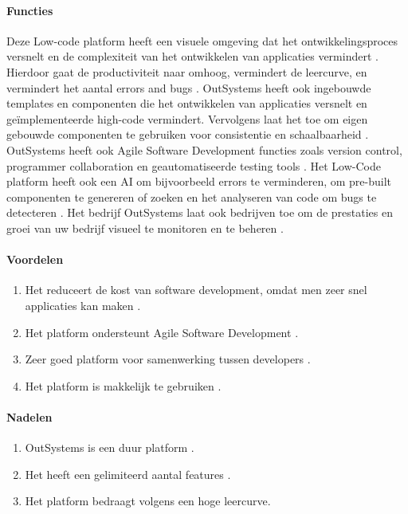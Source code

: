 \paragraph{Functies}
Deze Low-code platform heeft een visuele omgeving dat het ontwikkelingsproces versnelt en de complexiteit van het ontwikkelen van applicaties vermindert \autocite{Payne2023}.
Hierdoor gaat de productiviteit naar omhoog, vermindert de leercurve, en vermindert het aantal errors and bugs \autocite{Payne2023}. OutSystems heeft ook ingebouwde templates 
en componenten die het ontwikkelen van applicaties versnelt en geïmplementeerde high-code vermindert.
Vervolgens laat het toe om eigen gebouwde componenten te gebruiken voor consistentie en schaalbaarheid \autocite{Ranosys2023}.
OutSystems heeft ook Agile Software Development functies zoals version control, programmer collaboration en geautomatiseerde testing tools \autocite{Ranosys2023}.
Het Low-Code platform heeft ook een AI om bijvoorbeeld errors te verminderen, om pre-built componenten te genereren of zoeken en het analyseren van code om bugs te detecteren \autocite{Ranosys2023}.
Het bedrijf OutSystems laat ook bedrijven toe om de prestaties en groei van uw bedrijf visueel te monitoren en te beheren \autocite{Ranosys2023}.

\paragraph*{Voordelen}
\begin{enumerate}
    \item Het reduceert de kost van software development, omdat men zeer snel applicaties kan maken \autocite{Payne2023}.
    \item Het platform ondersteunt Agile Software Development \autocite{Payne2023}.
    \item Zeer goed platform voor samenwerking tussen developers \autocite{Payne2023}.
    \item Het platform is makkelijk te gebruiken \autocite{G22024OutSystems}.
\end{enumerate}


\paragraph*{Nadelen}
\begin{enumerate}
    \item OutSystems is een duur platform \autocite{G22024OutSystems}.
    \item Het heeft een gelimiteerd aantal features \autocite{G22024OutSystems}.
    \item Het platform bedraagt volgens \textcite{G22024OutSystems} een hoge leercurve.
\end{enumerate}

